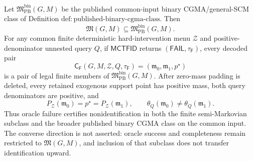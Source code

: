 Let \(\mathfrak M_{\mathrm{PB}}^{\mathrm{bin}}(G,M)\) be the published common-input binary CGMA/general-SCM class of Definition \(\mathrm{def:published\text{-}binary\text{-}cgma\text{-}class}\).  Then
\[
 \mathfrak M(G,M)\subseteq\mathfrak M_{\mathrm{PB}}^{\mathrm{bin}}(G,M).
\]
For any common finite deterministic hard-intervention menu \(\mathcal Z\) and positive-denominator unnested query \(Q\), if \(\mathsf{MCTFID}\) returns \((\mathsf{FAIL},\tau_{\mathsf F})\), every decoded pair
\[
 \mathsf C_{\mathsf F}(G,M,\mathcal Z,Q,\tau_{\mathsf F})
 = (\mathfrak m_0,\mathfrak m_1,p^{\star})
\]
is a pair of legal finite members of \(\mathfrak M_{\mathrm{PB}}^{\mathrm{bin}}(G,M)\).  After zero-mass padding is deleted, every retained exogenous support point has positive mass, both query denominators are positive, and
\[
 P_{\mathcal Z}(\mathfrak m_0)=p^{\star}=P_{\mathcal Z}(\mathfrak m_1),
 \qquad
 \theta_Q(\mathfrak m_0)\ne\theta_Q(\mathfrak m_1).
\]
Thus oracle failure certifies nonidentification in both the finite semi-Markovian subclass and the broader published binary CGMA class on the common input.  The converse direction is not asserted: oracle success and completeness remain restricted to \(\mathfrak M(G,M)\), and inclusion of that subclass does not transfer identification upward.